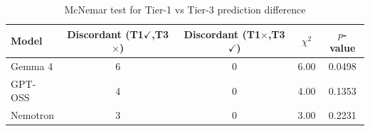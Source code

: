 \begin{table}[htbp]
\centering
\caption{McNemar test for Tier-1 vs Tier-3 prediction difference}
\label{tab:mcnemar}
\begin{tabular}{lcccc}
\toprule
\textbf{Model} & \textbf{Discordant (T1$\checkmark$,T3$\times$)} & \textbf{Discordant (T1$\times$,T3$\checkmark$)} & \textbf{$\chi^2$} & \textbf{$p$-value} \\
\midrule
Gemma 4 & 6 & 0 & 6.00 & 0.0498 \\
GPT-OSS & 4 & 0 & 4.00 & 0.1353 \\
Nemotron & 3 & 0 & 3.00 & 0.2231 \\
\bottomrule
\end{tabular}
\end{table}
